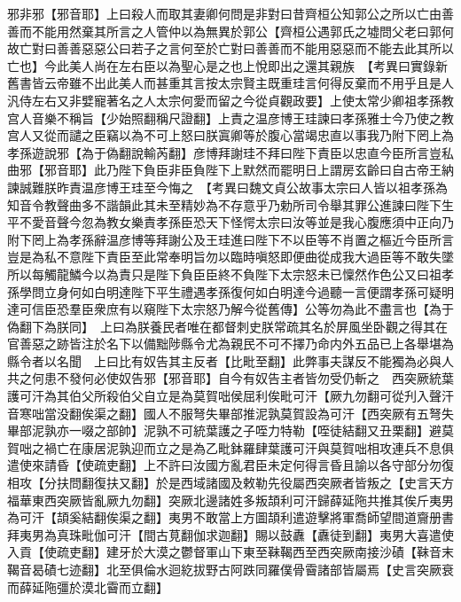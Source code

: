 邪非邪【邪音耶】上曰殺人而取其妻卿何問是非對曰昔齊桓公知郭公之所以亡由善善而不能用然棄其所言之人管仲以為無異於郭公【齊桓公遇郭氏之墟問父老曰郭何故亡對曰善善惡惡公曰若子之言何至於亡對曰善善而不能用惡惡而不能去此其所以亡也】今此美人尚在左右臣以為聖心是之也上悅即出之還其親族　【考異曰實錄新舊書皆云帝雖不出此美人而甚重其言按太宗賢主既重珪言何得反棄而不用乎且是人汎侍左右又非嬖寵著名之人太宗何愛而留之今從貞觀政要】上使太常少卿祖孝孫教宫人音樂不稱旨【少始照翻稱尺證翻】上責之温彦博王珪諫曰孝孫雅士今乃使之教宫人又從而譴之臣竊以為不可上怒曰朕寘卿等於腹心當竭忠直以事我乃附下罔上為孝孫遊說邪【為于偽翻說輸芮翻】彦博拜謝珪不拜曰陛下責臣以忠直今臣所言豈私曲邪【邪音耶】此乃陛下負臣非臣負陛下上默然而罷明日上謂房玄齡曰自古帝王納諫誠難朕昨責温彦博王珪至今悔之　【考異曰魏文貞公故事太宗曰人皆以祖孝孫為知音令教聲曲多不諧韻此其未至精妙為不存意乎乃勅所司令舉其罪公進諫曰陛下生平不愛音聲今忽為教女樂責孝孫臣恐天下怪愕太宗曰汝等並是我心腹應須中正向乃附下罔上為孝孫辭温彦博等拜謝公及王珪進曰陛下不以臣等不肖置之樞近今臣所言豈是為私不意陛下責臣至此常奉明旨勿以臨時嗔怒即便曲從成我大過臣等不敢失墜所以每觸龍鱗今以為責只是陛下負臣臣終不負陛下太宗怒未已懍然作色公又曰祖孝孫學問立身何如白明達陛下平生禮遇孝孫復何如白明達今過聽一言便謂孝孫可疑明達可信臣恐羣臣衆庶有以窺陛下太宗怒乃解今從舊傳】公等勿為此不盡言也【為于偽翻下為朕同】　上曰為朕養民者唯在都督刺史朕常疏其名於屏風坐卧觀之得其在官善惡之跡皆注於名下以備黜陟縣令尤為親民不可不擇乃命内外五品已上各舉堪為縣令者以名聞　上曰比有奴告其主反者【比毗至翻】此弊事夫謀反不能獨為必與人共之何患不發何必使奴告邪【邪音耶】自今有奴告主者皆勿受仍斬之　西突厥統葉護可汗為其伯父所殺伯父自立是為莫賀咄侯屈利俟毗可汗【厥九勿翻可從刋入聲汗音寒咄當没翻俟渠之翻】國人不服弩失畢部推泥孰莫賀設為可汗【西突厥有五弩失畢部泥孰亦一啜之部帥】泥孰不可統葉護之子咥力特勒【咥徒結翻又丑栗翻】避莫賀咄之禍亡在康居泥孰迎而立之是為乙毗鉢羅肆葉護可汗與莫賀咄相攻連兵不息俱遣使來請昏【使疏吏翻】上不許曰汝國方亂君臣未定何得言昏且諭以各守部分勿復相攻【分扶問翻復扶又翻】於是西域諸國及敕勒先役屬西突厥者皆叛之【史言天方福華東西突厥皆亂厥九勿翻】突厥北邊諸姓多叛頡利可汗歸薛延陁共推其俟斤夷男為可汗【頡奚結翻俟渠之翻】夷男不敢當上方圖頡利遣遊擊將軍喬師望間道齎册書拜夷男為真珠毗伽可汗【間古莧翻伽求迦翻】賜以鼓纛【纛徒到翻】夷男大喜遣使入貢【使疏吏翻】建牙於大漠之鬱督軍山下東至靺鞨西至西突厥南接沙磧【靺音末鞨音曷磧七迹翻】北至俱倫水迴紇拔野古阿跌同羅僕骨霫諸部皆屬焉【史言突厥衰而薛延陁彊於漠北霫而立翻】

